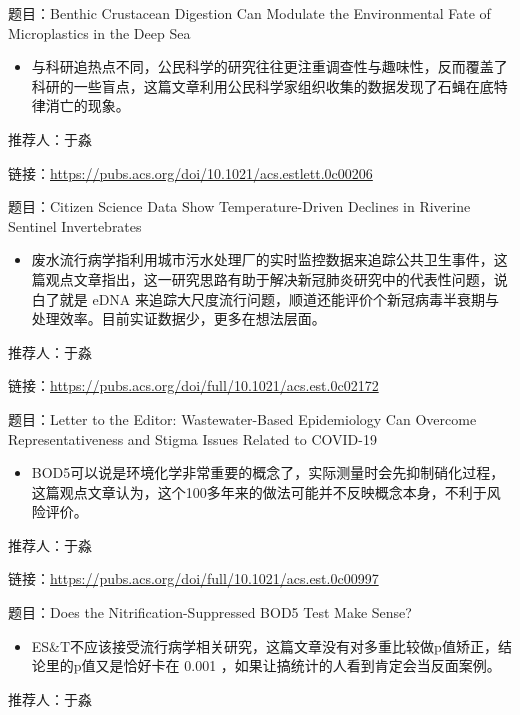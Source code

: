 \documentclass[
]{book}
\providecommand{\tightlist}{%
  \setlength{\itemsep}{0pt}\setlength{\parskip}{0pt}}
\begin{document}
题目：Benthic Crustacean Digestion Can Modulate the Environmental Fate of Microplastics in the Deep Sea

\begin{itemize}
\tightlist
\item
  与科研追热点不同，公民科学的研究往往更注重调查性与趣味性，反而覆盖了科研的一些盲点，这篇文章利用公民科学家组织收集的数据发现了石蝇在底特律消亡的现象。
\end{itemize}

推荐人：于淼

链接：\url{https://pubs.acs.org/doi/10.1021/acs.estlett.0c00206}

题目：Citizen Science Data Show Temperature-Driven Declines in Riverine Sentinel Invertebrates

\begin{itemize}
\tightlist
\item
  废水流行病学指利用城市污水处理厂的实时监控数据来追踪公共卫生事件，这篇观点文章指出，这一研究思路有助于解决新冠肺炎研究中的代表性问题，说白了就是 eDNA 来追踪大尺度流行问题，顺道还能评价个新冠病毒半衰期与处理效率。目前实证数据少，更多在想法层面。
\end{itemize}

推荐人：于淼

链接：\url{https://pubs.acs.org/doi/full/10.1021/acs.est.0c02172}

题目：Letter to the Editor: Wastewater-Based Epidemiology Can Overcome Representativeness and Stigma Issues Related to COVID-19

\begin{itemize}
\tightlist
\item
  BOD5可以说是环境化学非常重要的概念了，实际测量时会先抑制硝化过程，这篇观点文章认为，这个100多年来的做法可能并不反映概念本身，不利于风险评价。
\end{itemize}

推荐人：于淼

链接：\url{https://pubs.acs.org/doi/full/10.1021/acs.est.0c00997}

题目：Does the Nitrification-Suppressed BOD5 Test Make Sense?

\begin{itemize}
\tightlist
\item
  ES\&T不应该接受流行病学相关研究，这篇文章没有对多重比较做p值矫正，结论里的p值又是恰好卡在 0.001 ，如果让搞统计的人看到肯定会当反面案例。
\end{itemize}

推荐人：于淼
\end{document}
